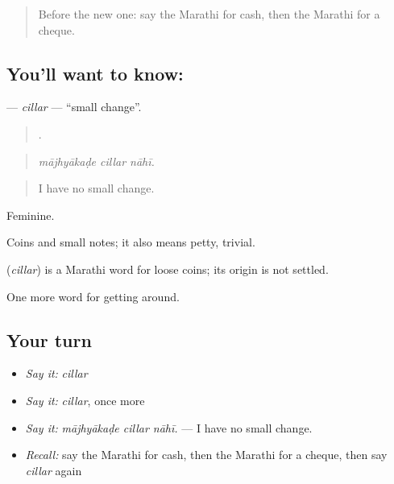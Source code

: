 \label{lesson:MR-C426-cillar}



\begin{quote}
Before the new one: say the Marathi for cash, then the Marathi for a cheque.
\end{quote}

\subsection*{You'll want to know: }
\textbf{} — \emph{cillar} — \textquotedblleft{}small change\textquotedblright{}.

\begin{quote}
  .
\end{quote}

\begin{quote}
\emph{mājhyākaḍe cillar nāhī.}
\end{quote}

\begin{quote}
I have no small change.
\end{quote}

Feminine.

Coins and small notes; it also means petty, trivial.

\begin{cousinweb}
\textbf{} (\emph{cillar}) is a Marathi word for loose coins; its origin is not settled.
\end{cousinweb}

\begin{grammarlens}[title={What you've built}]
One more word for getting around.
\end{grammarlens}

\subsection*{Your turn}
\begin{itemize}
\raggedright
  \item \emph{Say it:} \emph{cillar}
  \item \emph{Say it:} \emph{cillar}, once more
  \item \emph{Say it:} \emph{mājhyākaḍe cillar nāhī.} — I have no small change.
  \item \emph{Recall:} say the Marathi for cash, then the Marathi for a cheque, then say \emph{cillar} again
\end{itemize}

